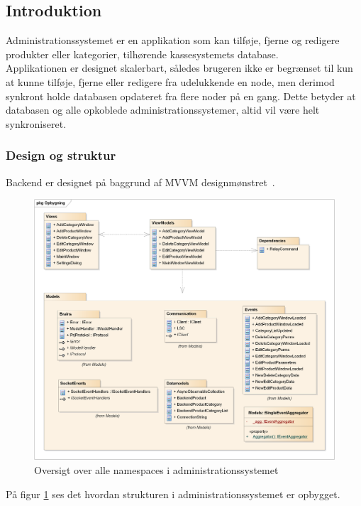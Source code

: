\subsection{Introduktion}


Administrationssystemet er en applikation som kan tilføje, fjerne og redigere produkter eller kategorier, tilhørende kassesystemets database.\\
Applikationen er designet skalerbart, således brugeren ikke er begrænset til kun at kunne tilføje, fjerne eller redigere fra udelukkende en node, men derimod synkront holde databasen opdateret fra flere noder på en gang. Dette betyder at databasen og alle opkoblede administrationssystemer, altid vil være helt synkroniseret.

\subsubsection*{Design og struktur}
Backend er designet på baggrund af MVVM designmønstret~\cite{MVVM}. 
\begin{figure}[!h]
    \centering
    \includegraphics[width=1\textwidth]{Systemdesign/backend/Images/Opbygning.png}
    \caption{Oversigt over alle namespaces i administrationssystemet}
    \label{fig:oversigtAs}
\end{figure}

På figur \ref{fig:oversigtAs} ses det hvordan strukturen i administrationssystemet er opbygget. 

